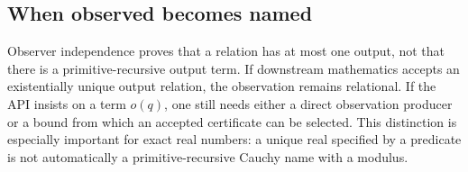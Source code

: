 \subsection{When observed becomes named}

Observer independence proves that a relation has at most one output, not that
there is a primitive-recursive output term.  If downstream mathematics accepts
an existentially unique output relation, the observation remains relational.
If the API insists on a term \(o(q)\), one still needs either a direct
observation producer or a bound from which an accepted certificate can be
selected.  This distinction is especially important for exact real numbers:
a unique real specified by a predicate is not automatically a
primitive-recursive Cauchy name with a modulus.
